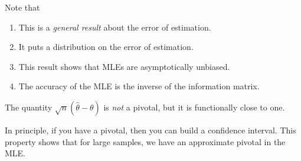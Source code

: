 \begin{remark}
Note that 
\begin{enumerate}
\item This is a \textit{general result} about the error of estimation.
    \item It puts a distribution on the error of estimation.
    \item This result shows that MLEs are asymptotically unbiased.
    \item The accuracy of the MLE is the inverse of the information matrix.
\end{enumerate}
\begin{note} The quantity $\sqrt{n}(\hat{\theta}-\theta)$ is \textit{not} a pivotal, but it is functionally close to one. 
\end{note}
In principle, if you have a pivotal, then you can build a confidence interval. This property shows that for large samples, we have an approximate pivotal in the MLE. 
\end{remark}
